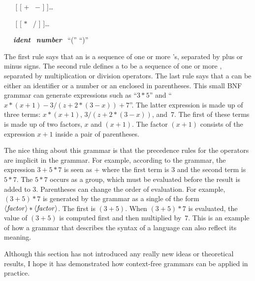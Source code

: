 \smallskip

\  \BNFPRODUCES\  [ [ + \BNFALT\ $-$ ]  ]\dots
\smallskip

\  \BNFPRODUCES\  [ [ $*$ \BNFALT\ / ]  ]\dots
\smallskip

\  \BNFPRODUCES\ \textbf{\textsl{ident}} \BNFALT\ \textbf{\textsl{number}} \BNFALT\ ``(''  ``)''
\smallskip

\noindent The first rule says that an  is a sequence of
one or more 's, separated by plus or minus signs.
The second rule defines a  to be a sequence of one or more
, separated by multiplication or division operators.
The last rule says that a  can be either an identifier
or a number or an  enclosed in parentheses.
This small BNF grammar can generate expressions 
such as ``$3*5$'' and ``$x*(x+1) - 3/(z+2*(3-x)) + 7$''.
The latter expression is made up of three terms: $x*(x+1)$,
$3/(z+2*(3-x))$, and~$7$.  The first of these terms is made
up of two factors, $x$ and $(x+1)$.  The factor $(x+1)$ consists
of the expression $x+1$ inside a pair of parentheses.

The nice thing about this grammar is that the precedence rules
for the operators are implicit in the grammar.  For example, according
to the grammar, the expression $3+5*7$ is seen as  + 
where the first term is $3$ and the second term is $5*7$.
The $5*7$ occurs as a group, which must be evaluated before the
result is added to $3$.  Parentheses can change the order of
evaluation.  For example, $(3+5)*7$ is generated by the grammar
as a single  of the form $\hbox{$\langle$\textit{factor}$\rangle$}*\hbox{$\langle$\textit{factor}$\rangle$}$.
The first  is $(3+5)$.  When $(3+5)*7$ is evaluated,
the value of $(3+5)$ is computed first and then multiplied
by~$7$.  This is an example of how a grammar that describes
the syntax of a language can also reflect its meaning.

\medskip

Although this section has not introduced any really new ideas
or theoretical results, I hope it has demonstrated how 
context-free grammars can be applied in practice.  

